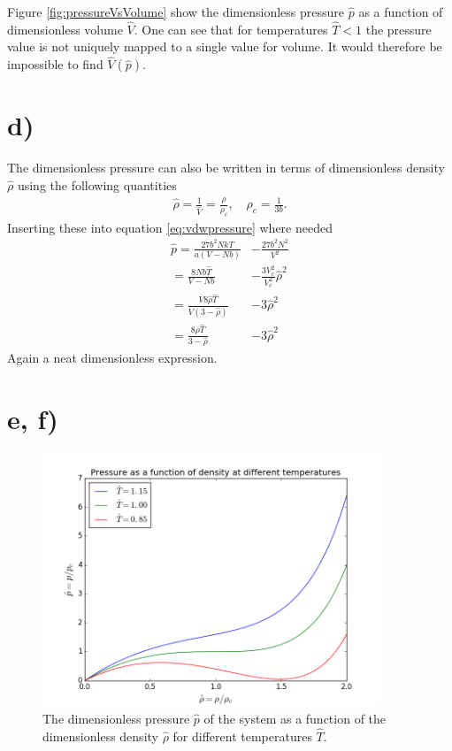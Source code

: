\documentclass{article}
\begin{document}
Figure \ref{fig:pressureVsVolume} show the dimensionless pressure $\hat{p}$ as a function of dimensionless volume $\hat{V}$. One can see that for temperatures $\hat{T} < 1$ the pressure value is not uniquely mapped to a single value for volume. It would therefore be impossible to find $\hat{V}(\hat{p})$.

\section*{d)}
The dimensionless pressure can also be written in terms of dimensionless density $\hat{\rho}$ using the following quantities
\begin{align*}
\hat{\rho}=\frac{1}{\hat{V}}=\frac{\rho}{\rho_c}, \quad \rho_c = \frac{1}{3b}.
\end{align*}
Inserting these into equation \ref{eq:vdwpressure} where needed
\begin{align}
\hat{p} = \frac{27b^2NkT}{a(V-Nb)} &- \frac{27b^2N^2}{V^2} \nonumber\\
		= \frac{8Nb\hat{T}}{V-Nb} &-\frac{3V_c^2}{V_c^2}\hat{\rho}^2 \nonumber\\
		= \frac{V8\hat{\rho}\hat{T}}{V(3-\hat{\rho})} &- 3\hat{\rho}^2 \nonumber\\
		= \frac{8\rho\hat{T}}{3-\hat{\rho}} &- 3\hat{\rho}^2 \label{eq:dimlessdensity}
\end{align}
Again a neat dimensionless expression.

\section*{e, f)}
\begin{figure}
	\centering
	\includegraphics[width=0.9\textwidth]{figures/pressureVsDensity.png}
	\caption{The dimensionless pressure $\hat{p}$ of the system as a function of the dimensionless density $\hat{\rho}$ for different temperatures $\hat{T}$.}
	\label{fig:pressureVsDensity}
\end{figure}
\end{document}

